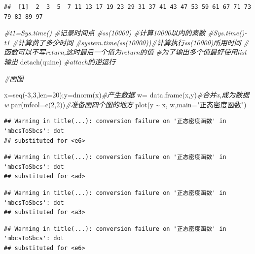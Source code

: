 \documentclass[
]{book}
\newenvironment{Shaded}{\begin{snugshade}}{\end{snugshade}}
\newcommand{\AttributeTok}[1]{\textcolor[rgb]{0.77,0.63,0.00}{#1}}
\newcommand{\CommentTok}[1]{\textcolor[rgb]{0.56,0.35,0.01}{\textit{#1}}}
\newcommand{\DecValTok}[1]{\textcolor[rgb]{0.00,0.00,0.81}{#1}}
\newcommand{\FunctionTok}[1]{\textcolor[rgb]{0.00,0.00,0.00}{#1}}
\newcommand{\NormalTok}[1]{#1}
\newcommand{\OtherTok}[1]{\textcolor[rgb]{0.56,0.35,0.01}{#1}}
\newcommand{\SpecialCharTok}[1]{\textcolor[rgb]{0.00,0.00,0.00}{#1}}
\newcommand{\StringTok}[1]{\textcolor[rgb]{0.31,0.60,0.02}{#1}}
\begin{document}
\begin{verbatim}
##  [1]  2  3  5  7 11 13 17 19 23 29 31 37 41 43 47 53 59 61 67 71 73 79 83 89 97
\end{verbatim}

\begin{Shaded}
\begin{Highlighting}[]
\CommentTok{\#t1=Sys.time() \#记录时间点}
\CommentTok{\#ss(10000) \#计算10000以内的素数}
\CommentTok{\#Sys.time(){-}t1 \#计算费了多少时间}
\CommentTok{\#system.time(ss(10000))\#计算执行ss(10000)所用时间}
\CommentTok{\#函数可以不写return,这时最后一个值为return的值}
\CommentTok{\#为了输出多个值最好使用list输出}
\FunctionTok{detach}\NormalTok{(quine) }\CommentTok{\#attach的逆运行}

\CommentTok{\#画图}

\NormalTok{x}\OtherTok{=}\FunctionTok{seq}\NormalTok{(}\SpecialCharTok{{-}}\DecValTok{3}\NormalTok{,}\DecValTok{3}\NormalTok{,}\AttributeTok{len=}\DecValTok{20}\NormalTok{);y}\OtherTok{=}\FunctionTok{dnorm}\NormalTok{(x)}\CommentTok{\#产生数据}
\NormalTok{w}\OtherTok{=} \FunctionTok{data.frame}\NormalTok{(x,y)}\CommentTok{\#合并x,成为数据w}
\FunctionTok{par}\NormalTok{(}\AttributeTok{mfcol=}\FunctionTok{c}\NormalTok{(}\DecValTok{2}\NormalTok{,}\DecValTok{2}\NormalTok{))}\CommentTok{\#准备画四个图的地方}
\FunctionTok{plot}\NormalTok{(y }\SpecialCharTok{\textasciitilde{}}\NormalTok{ x, w,}\AttributeTok{main=}\StringTok{"正态密度函数"}\NormalTok{)}
\end{Highlighting}
\end{Shaded}

\begin{verbatim}
## Warning in title(...): conversion failure on '正态密度函数' in 'mbcsToSbcs': dot
## substituted for <e6>
\end{verbatim}

\begin{verbatim}
## Warning in title(...): conversion failure on '正态密度函数' in 'mbcsToSbcs': dot
## substituted for <ad>
\end{verbatim}

\begin{verbatim}
## Warning in title(...): conversion failure on '正态密度函数' in 'mbcsToSbcs': dot
## substituted for <a3>
\end{verbatim}

\begin{verbatim}
## Warning in title(...): conversion failure on '正态密度函数' in 'mbcsToSbcs': dot
## substituted for <e6>
\end{verbatim}
\end{document}
